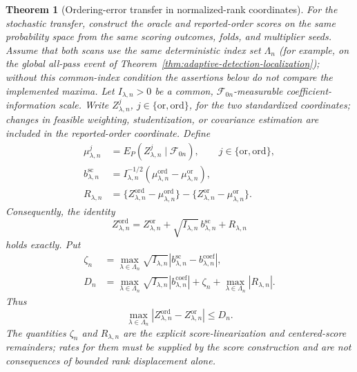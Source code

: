 \documentclass[11pt]{article}
\newtheorem{theorem}{Theorem}[section]
\theoremstyle{definition}
\newcommand{\1}{\mathbf 1}\newcommand{\op}{\operatorname}
\begin{document}
\begin{theorem}[Ordering-error transfer in normalized-rank coordinates]
For the stochastic transfer, construct the oracle and reported-order
scores on the same probability space from the same scoring outcomes,
folds, and multiplier seeds.  Assume that both scans use the same
deterministic index set $\Lambda_n$ (for example, on the global all-pass
event of Theorem~\ref{thm:adaptive-detection-localization}); without
this common-index condition the assertions below do not compare the
implemented maxima.  Let $I_{\lambda,n}>0$ be a common,
$\mathcal F_{0n}$-measurable coefficient-information scale.  Write
$Z_{\lambda,n}^{j}$, $j\in\{\mathrm{or},\mathrm{ord}\}$, for the
two standardized coordinates; changes in feasible weighting,
studentization, or covariance estimation are included in the
reported-order coordinate.  Define
\begin{align}
 \mu_{\lambda,n}^{j}
 &=E_P(Z_{\lambda,n}^{j}\mid\mathcal F_{0n}),
 \qquad j\in\{\mathrm{or},\mathrm{ord}\},
 \nonumber\\
 b_{\lambda,n}^{\mathrm{sc}}
 &=I_{\lambda,n}^{-1/2}
   (\mu_{\lambda,n}^{\mathrm{ord}}
    -\mu_{\lambda,n}^{\mathrm{or}}),
 \nonumber\\
 R_{\lambda,n}
 &=\{Z_{\lambda,n}^{\mathrm{ord}}
       -\mu_{\lambda,n}^{\mathrm{ord}}\}
   -\{Z_{\lambda,n}^{\mathrm{or}}
       -\mu_{\lambda,n}^{\mathrm{or}}\}.
 \label{eq:T4-score-components}
\end{align}
Consequently, the identity
\begin{equation}
 Z_{\lambda,n}^{\mathrm{ord}}
 =Z_{\lambda,n}^{\mathrm{or}}
  +\sqrt{I_{\lambda,n}}\,b_{\lambda,n}^{\mathrm{sc}}
  +R_{\lambda,n}
 \label{eq:T4-score-identity}
\end{equation}
holds exactly.  Put
\begin{align}
 \zeta_n
 &=\max_{\lambda\in\Lambda_n}
   \sqrt{I_{\lambda,n}}
   |b_{\lambda,n}^{\mathrm{sc}}
       -b_{\lambda,n}^{\mathrm{coef}}|,
 \nonumber\\
 D_n
 &=\max_{\lambda\in\Lambda_n}
   \sqrt{I_{\lambda,n}}
   |b_{\lambda,n}^{\mathrm{coef}}|
   +\zeta_n
   +\max_{\lambda\in\Lambda_n}|R_{\lambda,n}|.
 \label{eq:T4-total-error}
\end{align}
Thus
\begin{equation}
 \max_{\lambda\in\Lambda_n}
 |Z_{\lambda,n}^{\mathrm{ord}}
   -Z_{\lambda,n}^{\mathrm{or}}|
 \le D_n.
 \label{eq:T4-score-sup-bound}
\end{equation}
The quantities $\zeta_n$ and $R_{\lambda,n}$ are the explicit
score-linearization and centered-score remainders; rates for them
must be supplied by the score construction and are not consequences
of bounded rank displacement alone.


\end{theorem}
\end{document}
